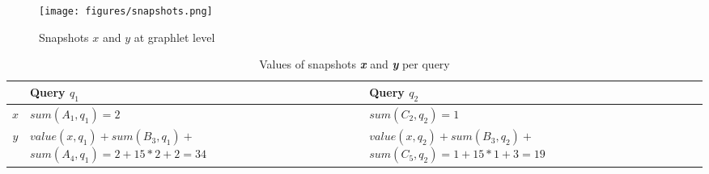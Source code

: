 \begin{figure}[h]
\centering
\texttt{[image: figures/snapshots.png]}
\caption{Snapshots $x$ and $y$ at graphlet level}
\label{fig:snapshots}
\end{figure}

\begin{table}[h]
    \centering
    \begin{tabular}{|c|p{6.8cm}|p{6.8cm}|}
    \hline
        & \textbf{Query} $q_1$
        & \textbf{Query} $q_2$ \\\hline\hline
        $x$ 
        & $sum(A_1,q_1) = 2$
        & $sum(C_2,q_2) = 1$ \\\hline
         \multirow{2}{*}{$y$}
        & $value(x,q_1) + sum(B_3,q_1) +$  
        $sum(A_4,q_1) = 2 + 15*2 + 2 = 34$
        & $value(x,q_2) + sum(B_3,q_2) +$
        $sum(C_5,q_2) = 1 + 15*1 + 3 = 19$ \\\hline
    \end{tabular}
    \caption{Values of snapshots \textbf{\textit{x}} and \textbf{\textit{y}} per query}
    \label{tab:snapshots}
\end{table}